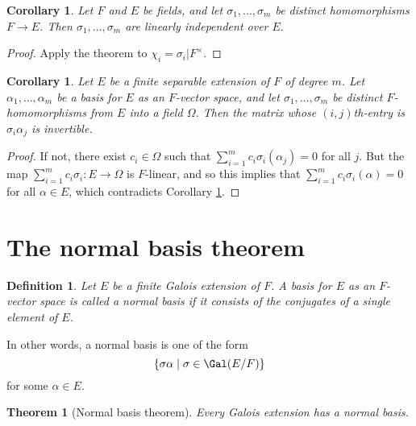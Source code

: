 \documentclass[a4paper,11pt,final,openany]{memoir}
\newtheorem{corollary}[X]{Corollary}
\newtheorem{theorem}[X]{Theorem}
\newtheorem{definition}[X]{Definition}
\theoremstyle{nonumberplain}
\newtheorem{proof}{Proof.}
\begin{document}
\begin{corollary}
\label{ag14}Let $F$ and $E$ be fields, and let $\sigma_{1},...,\sigma_{m}$ be
distinct homomorphisms $F\rightarrow E$. Then $\sigma_{1},...,\sigma_{m}$ are
linearly independent over $E.$
\end{corollary}

\begin{proof}
Apply the theorem to $\chi_{i}=\sigma_{i}|F^{\times}$.
\end{proof}

\begin{corollary}
\label{ag14m}Let $E$ be a finite separable extension of $F$ of degree $m$. Let
$\alpha_{1},\ldots,\alpha_{m}$ be a basis for $E$ as an $F$-vector space, and
let $\sigma_{1},\ldots,\sigma_{m}$ be distinct $F$-homomorphisms from $E$ into
a field $\Omega$. Then the matrix whose $(i,j)$th-entry is $\sigma_{i}%
\alpha_{j}$ is invertible.
\end{corollary}

\begin{proof}
If not, there exist $c_{i}\in\Omega$ such that $\sum\nolimits_{i=1}^{m}%
c_{i}\sigma_{i}(\alpha_{j})=0$ for all $j$. But the map $\sum\nolimits_{i=1}%
^{m}c_{i}\sigma_{i}\colon E\rightarrow\Omega$ is $F$-linear, and so this
implies that $\sum\nolimits_{i=1}^{m}c_{i}\sigma_{i}(\alpha)=0$ for all
$\alpha\in E$, which contradicts Corollary \ref{ag14}.
\end{proof}

\section{The normal basis theorem}%

%


\begin{definition}
\label{ag14a}Let $E$ be a finite Galois extension of $F$. A basis for $E$ as
an $F$-vector space is called a \emph{normal basis }%
if it consists of the conjugates of a single element of $E$.
\end{definition}

In other words, a normal basis is one of the form%
\[
\{\sigma\alpha\mid\sigma\in\Gal(E/F)\}
\]
for some $\alpha\in E$.

\begin{theorem}
[Normal basis theorem]\label{ag14b}Every Galois extension has a normal basis.
\end{theorem}
\end{document}
